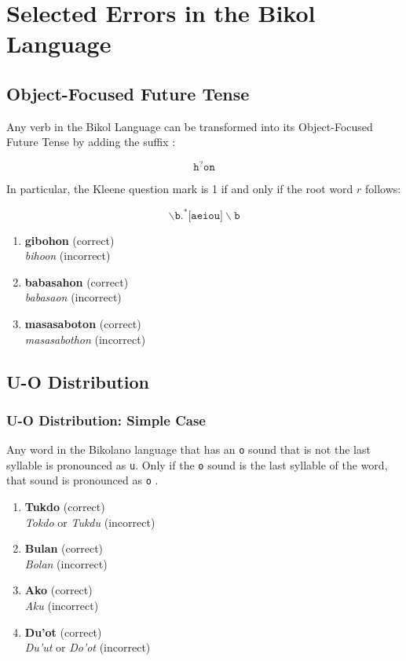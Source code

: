 \section{Selected Errors in the Bikol Language}
\subsection{Object-Focused Future Tense}
Any verb in the Bikol Language can be transformed into its Object-Focused Future Tense by adding the suffix \cite{bikol_dictionary}:

\[
      \texttt{h}^?\texttt{on}
\]

In particular, the Kleene question mark is 1 if and only if the root word $r$ follows:

\[
      \backslash\texttt{b.}^*\texttt{[aeiou]}\backslash\texttt{b}
\]

\begin{example}
\end{example}

\begin{enumerate}
      \item \textbf{gibohon} (correct) \\
            \textit{bihoon} (incorrect)
      \item \textbf{babasahon} (correct) \\
            \textit{babasaon} (incorrect)
      \item \textbf{masasaboton} (correct) \\
            \textit{masasabothon} (incorrect)
\end{enumerate}

\subsection{U-O Distribution}
\label{uo_distribution}
\subsubsection{U-O Distribution: Simple Case}
Any word in the Bikolano language that has an \texttt{o} sound that is not the last syllable is pronounced as \texttt{u}. Only if the \texttt{o} sound is the last syllable of the word, that sound is pronounced as \texttt{o} \cite{bikol_dictionary}.

\begin{example}
\end{example}

\begin{enumerate}
      \item \textbf{Tukdo} (correct) \\
            \textit{Tokdo} or \textit{Tukdu} (incorrect) 
      \item \textbf{Bulan} (correct) \\
            \textit{Bolan} (incorrect) 
      \item \textbf{Ako} (correct) \\
            \textit{Aku} (incorrect) 
      \item \textbf{Du'ot} (correct) \\
            \textit{Du'ut} or \textit{Do'ot} (incorrect) 
\end{enumerate}

